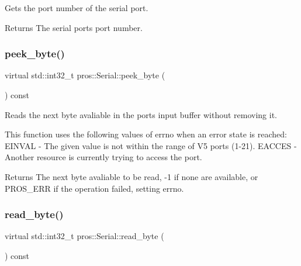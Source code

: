 Gets the port number of the serial port. 

\begin{DoxyReturn}{Returns}
The serial port\textquotesingle{}s port number. 
\end{DoxyReturn}
\mbox{\label{classpros_1_1Serial_a5ec51db5a7726f2220723971c1999881}} 
\subsubsection{\texorpdfstring{peek\+\_\+byte()}{peek\_byte()}}
{\footnotesize\ttfamily virtual std\+::int32\+\_\+t pros\+::\+Serial\+::peek\+\_\+byte (\begin{DoxyParamCaption}{ }\end{DoxyParamCaption}) const\hspace{0.3cm}{\ttfamily [virtual]}}



Reads the next byte avaliable in the port\textquotesingle{}s input buffer without removing it. 

This function uses the following values of errno when an error state is reached\+: E\+I\+N\+V\+AL -\/ The given value is not within the range of V5 ports (1-\/21). E\+A\+C\+C\+ES -\/ Another resource is currently trying to access the port.

\begin{DoxyReturn}{Returns}
The next byte avaliable to be read, -\/1 if none are available, or P\+R\+O\+S\+\_\+\+E\+RR if the operation failed, setting errno. 
\end{DoxyReturn}
\mbox{\label{classpros_1_1Serial_a59c62f236867ec160668389a47d09a5e}} 
\subsubsection{\texorpdfstring{read\+\_\+byte()}{read\_byte()}}
{\footnotesize\ttfamily virtual std\+::int32\+\_\+t pros\+::\+Serial\+::read\+\_\+byte (\begin{DoxyParamCaption}{ }\end{DoxyParamCaption}) const\hspace{0.3cm}{\ttfamily [virtual]}}



